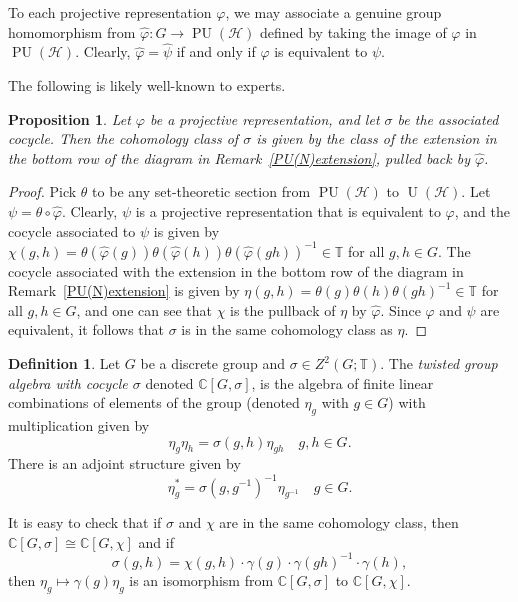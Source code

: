 \documentclass{amsart}
\newtheorem{proposition}[theorem]{Proposition}
\theoremstyle{definition}
\newtheorem{definition}[theorem]{Definition}
\newcommand{\C}{\mathbb{C}}
\newcommand{\TT}{\mathbb{T}}
\DeclareMathOperator{\U}{U}
\DeclareMathOperator{\PU}{PU}
\newcommand{\mc}{\mathcal}
\begin{document}
To each projective representation $\varphi$, we may associate a genuine group homomorphism from $\hat\varphi \colon G\rightarrow\PU(\mc{H})$ defined by taking the image of $\varphi$ in $\PU(\mc{H})$. Clearly, $\hat\varphi=\hat\psi$ if and only if $\varphi$ is equivalent to $\psi$.

The following is likely well-known to experts.

\begin{proposition}\label{cocycle_pullback}
Let $\varphi$ be a projective representation, and let $\sigma$ be the associated cocycle. Then the cohomology class of $\sigma$ is given by the class of the extension in the bottom row of the diagram in Remark~\ref{PU(N)extension}, pulled back by $\hat{\varphi}$.
\end{proposition}

\begin{proof}
Pick $\theta$ to be any set-theoretic section from $\PU(\mc{H})$ to $\U(\mc{H})$. Let $\psi=\theta\circ\hat\varphi$. Clearly, $\psi$ is a projective representation that is equivalent to $\varphi$, and the cocycle associated to $\psi$ is given by $\chi(g,h)=\theta(\hat\varphi(g))\theta(\hat\varphi(h))\theta(\hat{\varphi}(gh))^{-1}\in\TT$ for all $g, h \in G$. The cocycle associated with the extension in the bottom row of the diagram in Remark~\ref{PU(N)extension} is given by $\eta(g,h)=\theta(g)\theta(h)\theta(gh)^{-1}\in\TT$ for all $g, h \in G$, and one can see that $\chi$ is the pullback of $\eta$ by $\hat{\varphi}$. Since $\varphi$ and $\psi$ are equivalent, it follows that $\sigma$ is in the same cohomology class as $\eta$.
\end{proof}

\begin{definition}
Let $G$ be a discrete group and $\sigma\in Z^2(G;\TT)$. The {\em twisted group algebra with cocycle $\sigma$} denoted $\C[G,\sigma]$, is the algebra of finite linear combinations of elements of the group (denoted $\eta_g$ with $g\in G$) with multiplication given by
$$\eta_g\eta_h=\sigma(g,h)\eta_{gh} \quad g, h \in G.$$
There is an adjoint structure given by
$$\eta_g^*=\sigma(g,g^{-1})^{-1}\eta_{g^{-1}} \quad g \in G.$$
\end{definition}



It is easy to check that if $\sigma$ and $\chi$ are in the same cohomology class, then $\C[G,\sigma]\cong\C[G,\chi]$ and if $$\sigma(g,h)=\chi(g,h)\cdot\gamma(g)\cdot\gamma(gh)^{-1}\cdot\gamma(h),$$
then $\eta_g\mapsto\gamma(g)\eta_g$ is an isomorphism from $\C[G,\sigma]$ to $\C[G,\chi]$.
\end{document}
